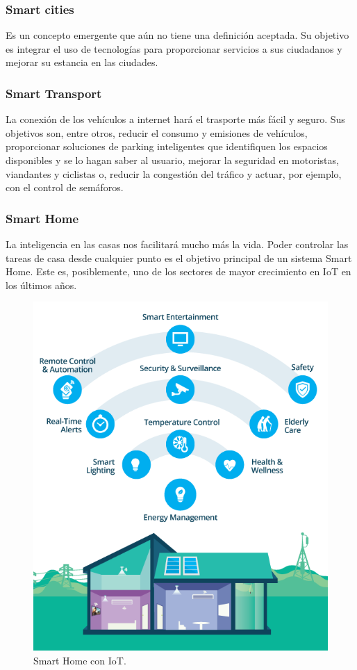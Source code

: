 \documentclass[12pt, twoside]{book}
\begin{document}
\subsubsection*{Smart cities} 
Es un concepto emergente que aún no tiene una definición aceptada. Su objetivo es integrar el uso de tecnologías para proporcionar servicios a sus ciudadanos y mejorar su estancia en las ciudades.
\subsubsection*{Smart Transport} 
La conexión de los vehículos a internet hará el trasporte más fácil y seguro. Sus objetivos son, entre otros, reducir el consumo y emisiones de vehículos, proporcionar soluciones de parking inteligentes que identifiquen los espacios disponibles y se lo hagan saber al usuario, mejorar la seguridad en motoristas, viandantes y ciclistas o, reducir la congestión del tráfico y actuar, por ejemplo, con el control de semáforos. 
\subsubsection*{Smart Home}
La inteligencia en las casas nos facilitará mucho más la vida. Poder controlar las tareas de casa desde cualquier punto es el objetivo principal de un sistema Smart Home. Este es, posiblemente, uno de los sectores de mayor crecimiento en IoT en los últimos años.
 \begin{figure}[H]
\centering
\includegraphics[scale=0.4]{images/smart_home}
\caption{Smart Home con IoT.}\label{smart_home}
\end{figure}
\end{document}
